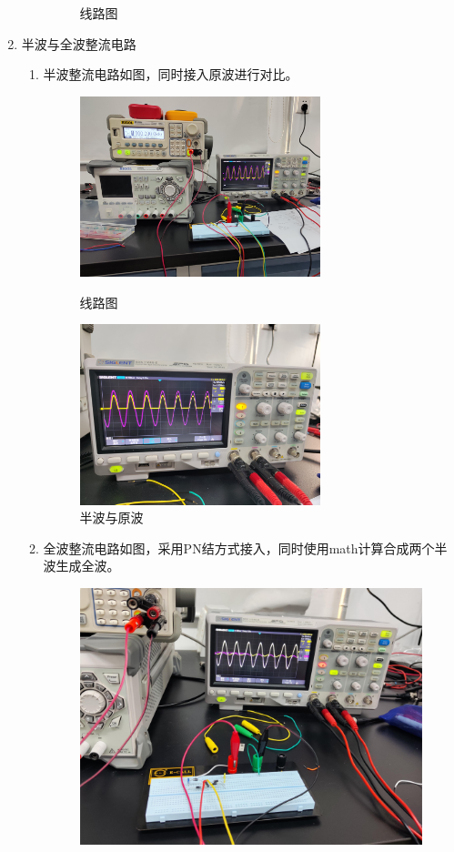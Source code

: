\documentclass[11pt]{article}
\begin{document}
\begin{enumerate}
\begin{enumerate}
\begin{figure}[H]
\begin{minipage}[H]{0.49\linewidth}
                \caption{线路图}
            \end{minipage}
        \end{figure}
    \end{enumerate}
    \item 半波与全波整流电路
    \begin{enumerate}
        \item 半波整流电路如图，同时接入原波进行对比。
        \begin{figure}[H]
            \centering
            \begin{minipage}[H]{0.49\linewidth}
                \includegraphics[width=7cm]{Fig/5.jpg}
                \caption{线路图}
            \end{minipage}
            \begin{minipage}[H]{0.49\linewidth}
                \includegraphics[width=7cm]{Fig/6.jpg}
                \caption{半波与原波}
            \end{minipage}
        \end{figure}
        \item 全波整流电路如图，采用PN结方式接入，同时使用math计算合成两个半波生成全波。
        \begin{figure}[H]
            \centering
            \includegraphics[width=10cm]{Fig/7.jpg}

\end{figure}
\end{enumerate}
\end{enumerate}
\end{document}
